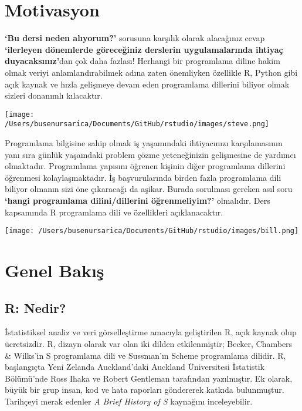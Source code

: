 \documentclass[
]{book}
\begin{document}
\hypertarget{motivasyon}{%
\chapter{Motivasyon}\label{motivasyon}}

\textbf{`Bu dersi neden alıyorum?'} sorusuna karşılık olarak alacağınız cevap \textbf{`ilerleyen dönemlerde göreceğiniz derslerin uygulamalarında ihtiyaç duyacaksınız'}dan çok daha fazlası! Herhangi bir programlama diline hakim olmak veriyi anlamlandırabilmek adına zaten önemliyken özellikle R, Python gibi açık kaynak ve hızla gelişmeye devam eden programlama dillerini biliyor olmak sizleri donanımlı kılacaktır.

\texttt{[image: /Users/busenursarica/Documents/GitHub/rstudio/images/steve.png]}

Programlama bilgisine sahip olmak iş yaşamındaki ihtiyacınızı karşılamasının yanı sıra günlük yaşamdaki problem çözme yeteneğinizin gelişmesine de yardımcı olmaktadır. Programlama yapısını öğrenen kişinin diğer programlama dillerini öğrenmesi kolaylaşmaktadır. İş başvurularında birden fazla programlama dili biliyor olmanın sizi öne çıkaracağı da aşikar. Burada sorulması gereken asıl soru \textbf{`hangi programlama dilini/dillerini öğrenmeliyim?'} olmalıdır. Ders kapsamında R programlama dili ve özellikleri açıklanacaktır.

\texttt{[image: /Users/busenursarica/Documents/GitHub/rstudio/images/bill.png]}

\hypertarget{genel-bakux131ux15f}{%
\chapter{Genel Bakış}\label{genel-bakux131ux15f}}

\hypertarget{r-nedir}{%
\section{R: Nedir?}\label{r-nedir}}

İstatistiksel analiz ve veri görselleştirme amacıyla geliştirilen R, açık kaynak olup ücretsizdir. R, dizayn olarak var olan iki dilden etkilenmiştir; Becker, Chambers \& Wilks'in S programlama dili ve Sussman'ın Scheme programlama dilidir. R, başlangıçta Yeni Zelanda Auckland'daki Auckland Üniversitesi İstatistik Bölümü'nde Ross Ihaka ve Robert Gentleman tarafından yazılmıştır. Ek olarak, büyük bir grup insan, kod ve hata raporları göndererek katkıda bulunmuştur. Tarihçeyi merak edenler \emph{A Brief History of S} \citep{Becker2004} kaynağını inceleyebilir.
\end{document}
